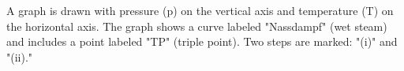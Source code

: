 A graph is drawn with pressure (p) on the vertical axis and temperature (T) on the horizontal axis. The graph shows a curve labeled "Nassdampf" (wet steam) and includes a point labeled "TP" (triple point). Two steps are marked: "(i)" and "(ii)."